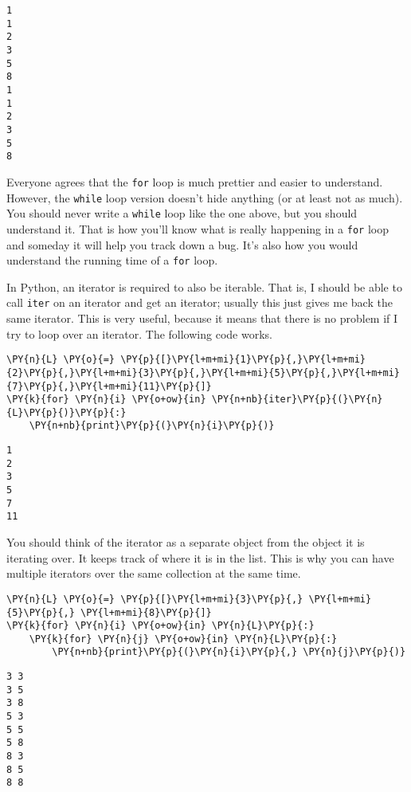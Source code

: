 \begin{Verbatim}
1
1
2
3
5
8
1
1
2
3
5
8

\end{Verbatim}


Everyone agrees that the \texttt{for} loop is much prettier and easier to understand.  However, the \texttt{while} loop version doesn’t hide anything (or at least not as much).  You should never write a \texttt{while} loop like the one above, but you should understand it.  That is how you’ll know what is really happening in a \texttt{for} loop and someday it will help you track down a bug.  It’s also how you would understand the running time of a \texttt{for} loop.


In Python, an iterator is required to also be iterable.  That is, I should be able to call \texttt{iter} on an iterator and get an iterator; usually this just gives me back the same iterator.  This is very useful, because it means that there is no problem if I try to loop over an iterator.  The following code works.


\begin{Verbatim}[commandchars=\\\{\}]
\PY{n}{L} \PY{o}{=} \PY{p}{[}\PY{l+m+mi}{1}\PY{p}{,}\PY{l+m+mi}{2}\PY{p}{,}\PY{l+m+mi}{3}\PY{p}{,}\PY{l+m+mi}{5}\PY{p}{,}\PY{l+m+mi}{7}\PY{p}{,}\PY{l+m+mi}{11}\PY{p}{]}
\PY{k}{for} \PY{n}{i} \PY{o+ow}{in} \PY{n+nb}{iter}\PY{p}{(}\PY{n}{L}\PY{p}{)}\PY{p}{:}
    \PY{n+nb}{print}\PY{p}{(}\PY{n}{i}\PY{p}{)}
\end{Verbatim}

\begin{Verbatim}
1
2
3
5
7
11

\end{Verbatim}


You should think of the iterator as a separate object from the object it is iterating over.  It keeps track of where it is in the list.  This is why you can have multiple iterators over the same collection at the same time.


\begin{Verbatim}[commandchars=\\\{\}]
\PY{n}{L} \PY{o}{=} \PY{p}{[}\PY{l+m+mi}{3}\PY{p}{,} \PY{l+m+mi}{5}\PY{p}{,} \PY{l+m+mi}{8}\PY{p}{]}
\PY{k}{for} \PY{n}{i} \PY{o+ow}{in} \PY{n}{L}\PY{p}{:}
    \PY{k}{for} \PY{n}{j} \PY{o+ow}{in} \PY{n}{L}\PY{p}{:}
        \PY{n+nb}{print}\PY{p}{(}\PY{n}{i}\PY{p}{,} \PY{n}{j}\PY{p}{)}
\end{Verbatim}

\begin{Verbatim}
3 3
3 5
3 8
5 3
5 5
5 8
8 3
8 5
8 8

\end{Verbatim}


